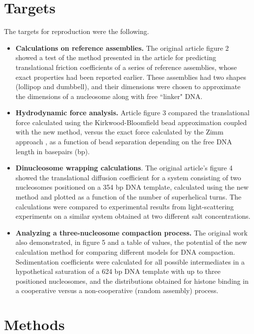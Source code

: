 \section{Targets}

The targets for reproduction were the following.

\begin{itemize}

\item \textbf{Calculations on reference assemblies.} The original article figure 2 showed a test of the method presented in the article for predicting translational friction coefficients of a series of  reference assemblies, whose exact properties had been reported earlier. These assemblies had two shapes (lollipop and dumbbell), and their dimensions were chosen to approximate the dimensions of a nucleosome along with free ``linker" DNA.

\item \textbf{Hydrodynamic force analysis.} Article figure 3 compared the translational force calculated using the Kirkwood-Bloomfield bead approximation coupled with the new method, versus the exact force calculated by the Zimm approach \supercite{Zimm1980}, as a function of bead separation depending on the free DNA length in basepairs (bp).

\item \textbf{Dinucleosome wrapping calculations}. The original article's figure 4 showed the translational diffusion coefficient for a system consisting of two nucleosomes positioned on a 354 bp DNA template, calculated using the new method and plotted as a function of the number of superhelical turns. The calculations were compared to experimental results from light-scattering experiments on a similar system obtained at two different salt concentrations.

\item \textbf{Analyzing a three-nucleosome compaction process.} The original work also demonstrated, in figure 5 and a table of values, the potential of the new calculation method for comparing different models for DNA compaction. Sedimentation coefficients were calculated for all possible intermediates in a hypothetical saturation of a 624 bp DNA template with up to three positioned nucleosomes, and the distributions obtained for histone binding in a cooperative versus a non-cooperative (random assembly) process.

\end{itemize}

\section{Methods}

